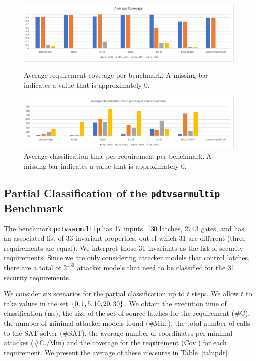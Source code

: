 \begin{figure}[!t]
\centering
\includegraphics[width=\textwidth]{AverageCoverage}
\caption{Average requirement coverage per benchmark. A missing bar indicates a value that is approximately 0.}
\label{fig:Classification:AverageCoverage}
\vspace{0.5cm}
\includegraphics[width=\textwidth]{AverageExecutionTime}
\caption{Average classification time per requirement per benchmark. A missing bar indicates a value that is approximately 0. }
\label{fig:Classification:AverageExecTime}
\end{figure}


\subsection{Partial Classification of the \texttt{pdtvsarmultip} Benchmark}
The benchmark \texttt{pdtvsarmultip} has 17 inputs, %
130 latches, %
2743 gates, %
and has an associated list of 33 invariant properties, out of which 31 are different (three requirements are equal). We interpret those 31 invariants as the list of security requirements. 
Since we are only considering attacker models that control latches, there are a total of $2^{130}$ attacker models that need to be classified for the 31 security requirements.

We consider six scenarios for the partial classification up to $t$ steps. We allow $t$ to take values in the set $\left\{0,1,5,10,20,30\right\}$. We obtain the execution time of classification (ms), the size of the set of source latches for the requirement (\#C), the number of minimal attacker models found (\#Min.), the total number of calls to the SAT solver (\#SAT), the average number of coordinates per minimal attacker (\#C./Min) and the coverage for the requirement (Cov.) for each requirement. We present the average of these measures in Table~\ref{tab:pdt}. 

